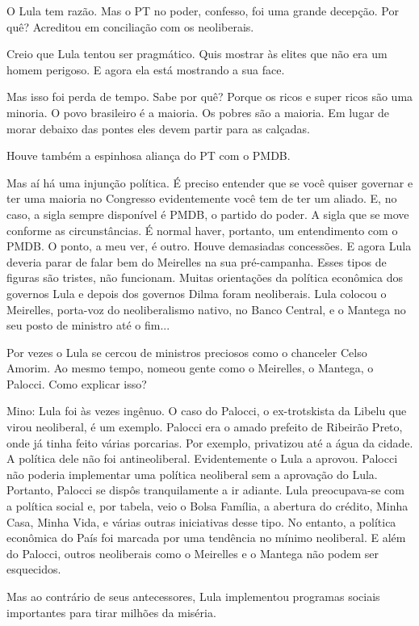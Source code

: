 \falaM O Lula tem razão. Mas o PT no poder, confesso, foi uma grande
decepção. Por quê? Acreditou em conciliação com os neoliberais.

\falaG Creio que Lula tentou ser pragmático. Quis mostrar às elites que não
era um homem perigoso. E agora ela está mostrando a sua face.

\falaM Mas isso foi perda de tempo. Sabe por quê? Porque os ricos e super
ricos são uma minoria. O povo brasileiro é a maioria. Os pobres são a
maioria. Em lugar de morar debaixo das pontes eles devem partir para as
calçadas.

\falaG Houve também a espinhosa aliança do PT com o PMDB.

\falaM Mas aí há uma injunção política. É preciso entender que se você
quiser governar e ter uma maioria no Congresso evidentemente você tem de
ter um aliado. E, no caso, a sigla sempre disponível é PMDB, o partido
do poder. A sigla que se move conforme as circunstâncias. É normal
haver, portanto, um entendimento com o PMDB. O ponto, a meu ver, é
outro. Houve demasiadas concessões. E agora Lula deveria parar de falar
bem do Meirelles na sua pré-campanha. Esses tipos de figuras são
tristes, não funcionam. Muitas orientações da política econômica dos
governos Lula e depois dos governos Dilma foram neoliberais. Lula
colocou o Meirelles, porta-voz do neoliberalismo nativo, no Banco
Central, e o Mantega no seu posto de ministro até o fim...

\falaG Por vezes o Lula se cercou de ministros preciosos como o chanceler
Celso Amorim. Ao mesmo tempo, nomeou gente como o Meirelles, o Mantega,
o Palocci. Como explicar isso?

Mino: Lula foi às vezes ingênuo. O caso do Palocci, o ex-trotskista da
Libelu que virou neoliberal, é um exemplo. Palocci era o amado prefeito
de Ribeirão Preto, onde já tinha feito várias porcarias. Por exemplo,
privatizou até a água da cidade. A política dele não foi antineoliberal.
Evidentemente o Lula a aprovou. Palocci não poderia implementar uma
política neoliberal sem a aprovação do Lula. Portanto, Palocci se dispôs
tranquilamente a ir adiante. Lula preocupava-se com a política social e,
por tabela, veio o Bolsa Família, a abertura do crédito, Minha Casa,
Minha Vida, e várias outras iniciativas desse tipo. No entanto, a
política econômica do País foi marcada por uma tendência no mínimo
neoliberal. E além do Palocci, outros neoliberais como o Meirelles e o
Mantega não podem ser esquecidos.

\falaG Mas ao contrário de seus antecessores, Lula implementou programas
sociais importantes para tirar milhões da miséria.

